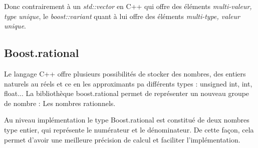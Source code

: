 Donc contrairement à un \textit{std::vector} en C++ qui offre des éléments \textit{multi-valeur, type unique}, le \textit{boost::variant} quant à lui offre des éléments \textit{multi-type, valeur unique}.


\subsection*{Boost.rational}

Le langage C++ offre plusieurs possibilités de stocker des nombres, des entiers naturels au réels et ce en les approximants pa différents types : unsigned int, int, float... La bibliothèque boost.rational permet de représenter un nouveau groupe de nombre : Les nombres rationnels.

Au niveau implémentation le type Boost.rational est constitué de deux nombres type entier, qui représente le numérateur et le dénominateur. De cette façon, cela permet d'avoir une meilleure précision de calcul et faciliter l'implémentation.


